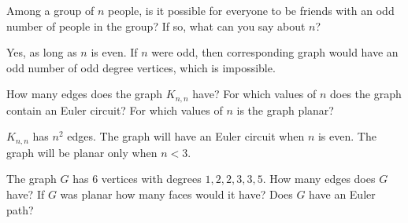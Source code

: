 \begin{squestions}

  \begin{answer}
  \end{answer}
  
  

\question Among a group of $n$ people, is it possible for everyone to be friends with an odd number of people in the group?  If so, what can you say about $n$?

  \begin{answer}
  Yes, as long as $n$ is even.  If $n$ were odd, then corresponding graph would have an odd number of odd degree vertices, which is impossible.
  \end{answer}

 
 \question How many edges does the graph $K_{n,n}$ have?  For which values of $n$ does the graph contain an Euler circuit?  For which values of $n$ is the graph planar?

  \begin{answer}
  $K_{n,n}$ has $n^2$ edges.  The graph will have an Euler circuit when $n$ is even.  The graph will be planar only when $n < 3$.
  \end{answer}
 
 
 
 \question The graph $G$ has 6 vertices with degrees $1, 2, 2, 3, 3, 5$.  How many edges does $G$ have?  If $G$ was planar how many faces would it have?  Does $G$ have an Euler path?


\end{squestions}
